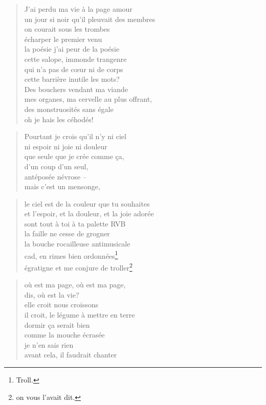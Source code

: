   \begin{verse}
    J’ai perdu ma vie à la page amour\\
    un jour si noir qu’il pleuvait des membres\\
    on courait sous les trombes\\
    écharper le premier venu\\
    la poésie j’ai peur de la poésie\\
    cette salope, immonde trangenre\\
    qui n’a pas de cœur ni de corps\\
    cette barrière inutile les mots?\\
    Des bouchers vendant ma viande\\
    mes organes, ma cervelle au plus offrant,\\
    des monstruosités sans égale\\
    oh je hais les céhodés!
  \end{verse}
  \begin{verse}
    Pourtant je crois qu’il n’y ni ciel\\
    ni espoir ni joie ni douleur\\
    que seule que je crée comme ça,\\
    d’un coup d’un seul,\\
    antéposée névrose --\\
    mais c’est un mensonge,
  \end{verse}
  \begin{verse}
    le ciel est de la couleur que tu souhaites\\
    et l’espoir, et la douleur, et la joie adorée\\
    sont tout à toi à ta palette RVB\\
    la faille ne cesse de grogner\\
    la bouche rocailleuse antimusicale\\
    cad, en rimes bien ordonnées\footnote{Troll.}\\
    égratigne et me conjure de troller\footnote{on vous l’avait dit.}
  \end{verse}
  \begin{verse}
    où est ma page, où est ma page,\\
    dis, où est la vie?\\
    elle croit nous croissons\\
    il croit, le légume à mettre en terre\\
    dormir ça serait bien\\
    comme la mouche écrasée\\
    je n’en sais rien\\
    avant cela, il faudrait chanter
  \end{verse}
